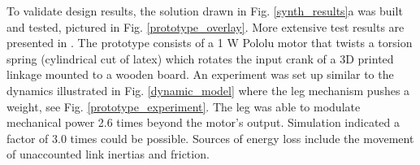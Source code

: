 \documentclass[journal]{IEEEtran}
\begin{document}





To validate design results, the solution drawn in Fig. \ref{synth_results}a was built and tested, pictured in Fig. \ref{prototype_overlay}.
More extensive test results are presented in \cite{plecnikAdjustablePowerModulation2019}.
The prototype consists of a 1 W Pololu motor that twists a torsion spring (cylindrical cut of latex) which rotates the input crank of a 3D printed linkage mounted to a wooden board.
An experiment was set up similar to the dynamics illustrated in Fig. \ref{dynamic_model} where the leg mechanism pushes a weight, see Fig. \ref{prototype_experiment}.
The leg was able to modulate mechanical power 2.6 times beyond the motor's output.
Simulation indicated a factor of 3.0 times could be possible.
Sources of energy loss include the movement of unaccounted link inertias and friction.




%
%

\end{document}
